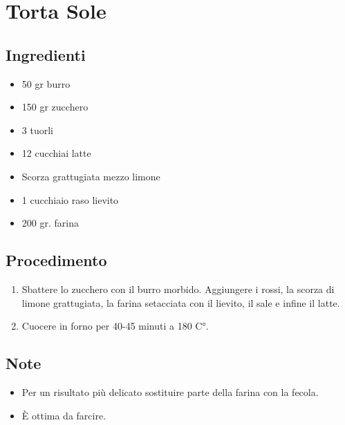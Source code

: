 \section{Torta Sole}
\subsection{Ingredienti}
\begin{itemize}
\item 50 gr burro  
\item 150 gr zucchero  
\item 3 tuorli  
\item 12 cucchiai latte  
\item Scorza grattugiata mezzo limone  
\item 1 cucchiaio raso lievito  
\item 200 gr. farina 
\end{itemize}
\subsection{Procedimento}
\begin{enumerate}
\item  Sbattere lo zucchero con il burro morbido. Aggiungere i rossi, la scorza di limone grattugiata, la farina setacciata con il lievito, il sale e infine il latte.  
\item  Cuocere in forno per 40-45 minuti a 180 C°.
\end{enumerate}
\subsection{Note}
\begin{itemize}
\item Per un risultato più delicato sostituire parte della farina con la fecola.  
\item È ottima da farcire.
\end{itemize}
